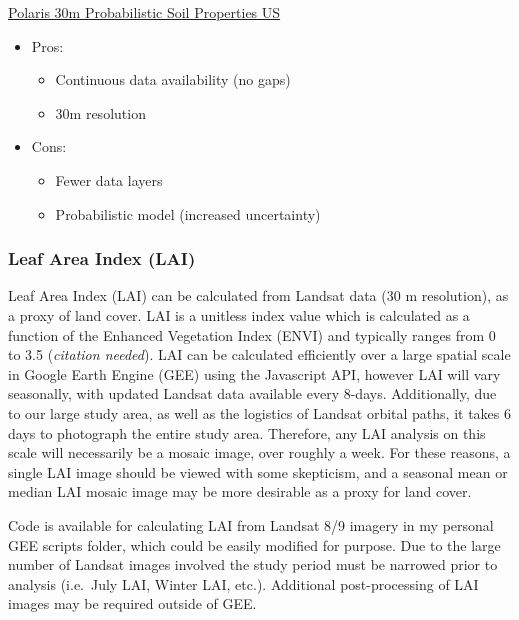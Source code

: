 \documentclass[
]{agujournal2019}
\providecommand{\tightlist}{%
  \setlength{\itemsep}{0pt}\setlength{\parskip}{0pt}}
\begin{document}
\href{https://gee-community-catalog.org/projects/polaris/}{Polaris 30m
Probabilistic Soil Properties US}

\begin{itemize}
\tightlist
\item
  Pros:

  \begin{itemize}
  \tightlist
  \item
    Continuous data availability (no gaps)
  \item
    30m resolution
  \end{itemize}
\item
  Cons:

  \begin{itemize}
  \tightlist
  \item
    Fewer data layers
  \item
    Probabilistic model (increased uncertainty)
  \end{itemize}
\end{itemize}

\subsubsection{Leaf Area Index (LAI)}\label{leaf-area-index-lai}

Leaf Area Index (LAI) can be calculated from Landsat data (30 m
resolution), as a proxy of land cover. LAI is a unitless index value
which is calculated as a function of the Enhanced Vegetation Index
(ENVI) and typically ranges from 0 to 3.5 (\emph{citation needed}). LAI
can be calculated efficiently over a large spatial scale in Google Earth
Engine (GEE) using the Javascript API, however LAI will vary seasonally,
with updated Landsat data available every 8-days. Additionally, due to
our large study area, as well as the logistics of Landsat orbital paths,
it takes 6 days to photograph the entire study area. Therefore, any LAI
analysis on this scale will necessarily be a mosaic image, over roughly
a week. For these reasons, a single LAI image should be viewed with some
skepticism, and a seasonal mean or median LAI mosaic image may be more
desirable as a proxy for land cover.

Code is available for calculating LAI from Landsat 8/9 imagery in my
personal GEE scripts folder, which could be easily modified for purpose.
Due to the large number of Landsat images involved the study period must
be narrowed prior to analysis (i.e.~July LAI, Winter LAI, etc.).
Additional post-processing of LAI images may be required outside of GEE.
\end{document}
